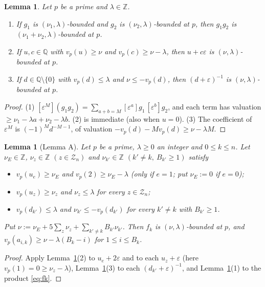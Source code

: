 \documentclass[11pt]{amsart}
\newtheorem{lemma}[theorem]{Lemma}
\theoremstyle{definition}
\theoremstyle{remark}
\numberwithin{equation}{section}
\newcommand{\ZZ}{\mathbb{Z}}
\newcommand{\QQ}{\mathbb{Q}}
\newcommand{\eps}{\varepsilon}
\begin{document}
\begin{lemma}\label{lem:psge}
Let $p$ be a prime and $\lambda\in\ZZ$.
\begin{enumerate}
\item If $g_1$ is $(\nu_1,\lambda)$-bounded and $g_2$ is $(\nu_2,\lambda)$-bounded at $p$, then $g_1g_2$ is
  $(\nu_1+\nu_2,\lambda)$-bounded at $p$.
\item If $u,c\in\QQ$ with $v_p(u)\ge \nu$ and $v_p(c)\ge \nu-\lambda$, then $u+c\eps$ is
  $(\nu,\lambda)$-bounded at $p$.
\item If $d\in\QQ\setminus\{0\}$ with $v_p(d)\le\lambda$ and $\nu\le -v_p(d)$, then $(d+\eps)^{-1}$
  is $(\nu,\lambda)$-bounded at $p$.
\end{enumerate}
\end{lemma}

\begin{proof}
(1) $[\eps^M](g_1g_2)=\sum_{a+b=M}[\eps^a]g_1\,[\eps^b]g_2$, and each term has valuation
$\ge \nu_1-\lambda a+\nu_2-\lambda b$. (2) is immediate (also when $u=0$). (3) The coefficient of $\eps^M$ is
$(-1)^Md^{-M-1}$, of valuation $-v_p(d)-Mv_p(d)\ge \nu-\lambda M$.
\end{proof}

\begin{lemma}[Lemma A]\label{lem:A}
Let $p$ be a prime, $\lambda\ge0$ an integer and $0\le k\le n$. Let $\nu_E\in\ZZ$, $\nu_z\in\ZZ$
$(z\in\mathcal Z_n)$ and $\nu_{k'}\in\ZZ$ $(k'\ne k,\ B_{k'}\ge1)$ satisfy
\begin{itemize}
\item $v_p(u_e)\ge \nu_E$ and $v_p(2)\ge \nu_E-\lambda$ (only if $e=1$; put $\nu_E:=0$ if $e=0$);
\item $v_p(u_z)\ge \nu_z$ and $\nu_z\le\lambda$ for every $z\in\mathcal Z_n$;
\item $v_p(d_{k'})\le\lambda$ and $\nu_{k'}\le -v_p(d_{k'})$ for every $k'\ne k$ with $B_{k'}\ge1$.
\end{itemize}
Put $\nu:=\nu_E+5\sum_{z}\nu_z+\sum_{k'\ne k}B_{k'}\nu_{k'}$. Then $f_k$ is $(\nu,\lambda)$-bounded at $p$, and
$v_p(a_{i,k})\ge \nu-\lambda(B_k-i)$ for $1\le i\le B_k$.
\end{lemma}

\begin{proof}
Apply Lemma~\ref{lem:psge}(2) to $u_e+2\eps$ and to each $u_z+\eps$ (here $v_p(1)=0\ge\nu_z-\lambda$),
Lemma~\ref{lem:psge}(3) to each $(d_{k'}+\eps)^{-1}$, and Lemma~\ref{lem:psge}(1) to the product \eqref{eq:fk}.
\end{proof}
\end{document}
